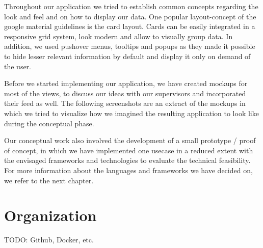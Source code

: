 Throughout our application we tried to establish common concepts regarding the look and feel and on how to display our data. One popular layout-concept of the google material guidelines is the card layout. Cards can be easily integrated in a responsive grid system, look modern and allow to visually group data. In addition, we used pushover menus, tooltips and popups as they made it possible to hide lesser relevant information by default and display it only on demand of the user.

Before we started implementing our application, we have created mockups for most of the views, to discuss our ideas with our supervisors and incorporated their feed as well. The following screenshots are an extract of the mockups in which we tried to visualize how we imagined the resulting application to look like during the conceptual phase. 


Our conceptual work also involved the development of a small prototype / proof of concept, in which we have implemented one usecase in a reduced extent with the envisaged frameworks and technologies to evaluate the technical feasibility. For more information about the languages and frameworks we have decided on, we refer to the next chapter.

\section{Organization}
TODO: Github, Docker, etc.